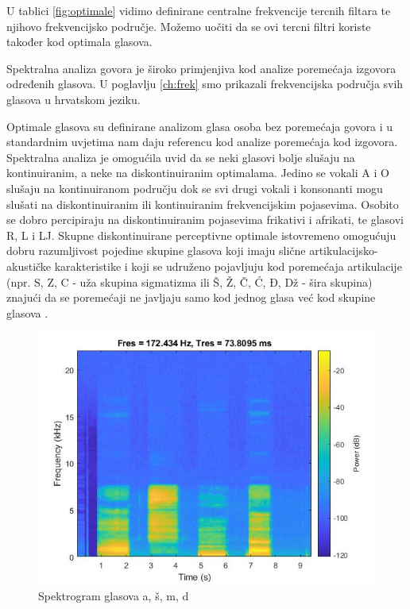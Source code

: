 \documentclass[times, utf8, diplomski]{fer}
\begin{document}
U tablici \ref{fig:optimale} vidimo definirane centralne frekvencije tercnih filtara te njihovo frekvencijsko područje. Možemo uočiti da se ovi tercni filtri koriste također kod optimala glasova.

Spektralna analiza govora je široko primjenjiva kod analize poremećaja izgovora određenih glasova. U poglavlju \ref{ch:frek} smo prikazali frekvencijska područja svih glasova u hrvatskom jeziku. 

Optimale glasova su definirane analizom glasa osoba bez poremećaja govora i u standardnim uvjetima nam daju referencu kod analize poremećaja kod izgovora. Spektralna analiza je omogućila uvid da se neki glasovi bolje slušaju na kontinuiranim, a neke na diskontinuiranim optimalama. Jedino se vokali A i O slušaju na kontinuiranom području dok se svi drugi vokali i konsonanti mogu slušati na diskontinuiranim ili kontinuiranim frekvencijskim pojasevima. Osobito se dobro percipiraju na diskontinuiranim pojasevima frikativi i afrikati, te glasovi R, L i LJ. Skupne diskontinuirane perceptivne optimale istovremeno omogućuju dobru razumljivost pojedine skupine glasova koji imaju slične artikulacijsko-akustičke karakteristike i koji se udruženo pojavljuju kod poremećaja artikulacije (npr. S, Z, C - uža skupina sigmatizma ili Š, Ž, Č, Ć, Đ, Dž - šira skupina) znajući da se poremećaji ne javljaju samo kod jednog glasa  već kod skupine glasova \citep{optimala}.

\begin{figure}[ht!]

  \includegraphics[scale=0.7]{photos/spect.jpg}
  \caption{Spektrogram glasova a, š, m, d}
  \label{fig:spektrogram glasa}
\end{figure}
\end{document}

